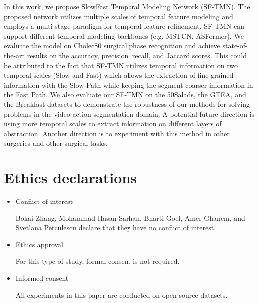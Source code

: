 \documentclass[sn-mathphys,Numbered]{sn-jnl}
\theoremstyle{thmstyleone}\newtheorem{theorem}{Theorem}\newtheorem{proposition}[theorem]{Proposition}
\theoremstyle{thmstyletwo}\newtheorem{example}{Example}\newtheorem{remark}{Remark}
\theoremstyle{thmstylethree}\newtheorem{definition}{Definition}
\begin{document}
In this work, we propose SlowFast Temporal Modeling Network (SF-TMN). The proposed network utilizes multiple scales of temporal feature modeling and employs a multi-stage paradigm for temporal feature refinement. SF-TMN can support different temporal modeling backbones (e.g. MSTCN, ASFormer). We evaluate the model on Cholec80 surgical phase recognition and achieve state-of-the-art results on the accuracy, precision, recall, and Jaccard scores. This could be attributed to the fact that SF-TMN utilizes temporal information on two temporal scales (Slow and Fast) which allows the extraction of fine-grained information with the Slow Path while keeping the segment coarser information in the Fast Path. We also evaluate our SF-TMN on the 50Salads, the GTEA, and the Breakfast datasets to demonstrate the robustness of our methods for solving problems in the video action segmentation domain. A potential future direction is using more temporal scales to extract information on different layers of abstraction. Another direction is to experiment with this method in other surgeries and other surgical tasks.






\section*{Ethics declarations}

\begin{itemize}
\item Conflict of interest

Bokai Zhang, Mohammad Hasan Sarhan, Bharti Goel, Amer Ghanem, and Svetlana Petculescu declare that they have no conflict of interest.

\item Ethics approval 

For this type of study, formal consent is not required. 

\item Informed consent

All experiments in this paper are conducted on open-source datasets. 

\end{itemize}
\end{document}
